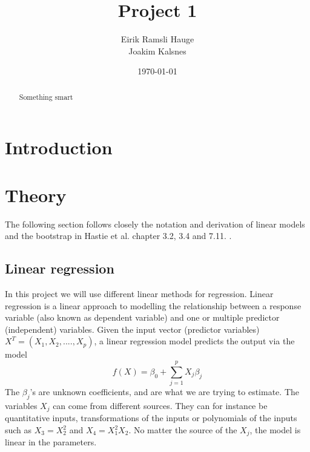 \documentclass[12pt]{article}
\title{Project 1}
\author{Eirik Ramsli Hauge\\
Joakim Kalsnes
}
\date{\today}
\begin{document}
\maketitle

\begin{abstract}
Something smart
\end{abstract}
\section{Introduction}   \label{s:i}

\section{Theory}   \label{s:t}
The following section follows closely the notation and derivation of linear models and the bootstrap in Hastie et al. chapter 3.2, 3.4 and 7.11. \cite{Hastie2017}.
\subsection{Linear regression}
In this project we will use different linear methods for regression. Linear regression is a linear approach to modelling the relationship between a response variable (also known as dependent variable) and one or multiple predictor (independent) variables. Given the input vector (predictor variables) $X^T = (X_1, X_2,...., X_p)$, a linear regression model predicts the output via the model
\begin{equation} \label{eq:lin_reg}
f(X) = \beta_{0} + \sum_{j=1}^{p}X_j\beta_{j}
\end{equation}
The $\beta_j$'s are unknown coefficients, and are what we are trying to estimate. The variables $X_j$ can come from different sources. They can for instance be quantitative inputs, transformations of the inputs or polynomials of the inputs such as $X_3 = X_2^2$ and $X_4 = X_1^2X_2$. No matter the source of the $X_j$, the model is linear in the parameters.
\end{document}

